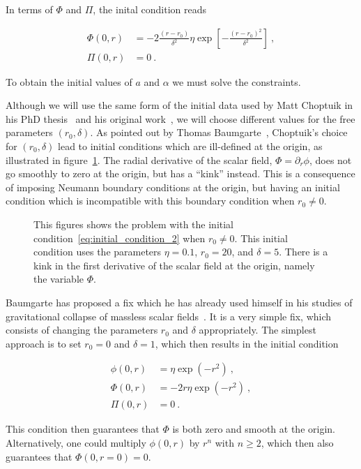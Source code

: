 \documentclass[a4paper,11pt]{article}
\renewcommand{\a}{\alpha}
\renewcommand{\d}{\delta}
\newcommand{\pd}{\partial}
\newcommand{\lrpar}[1]{\left( #1 \right)}
\newcommand{\lrsquare}[1]{\left[ #1 \right]}
\newcommand{\n}{\noindent}
\newcommand{\eq}[1]{
  \begin{equation}
    #1
  \end{equation}
}
\newcommand{\spl}[1]{
  \begin{split}
    #1
  \end{split}
}
\begin{document}
In terms of $\Phi$ and $\Pi$, the inital condition reads

\eq{
  \spl{
    \Phi(0,r) &= -2\frac{\lrpar{r-r_{0}}}{\d^{2}}\eta\exp\lrsquare{-\frac{\lrpar{r-r_{0}}^{2}}{\d^{2}}}\ ,\\
    \Pi(0,r)  &= 0\ .
  }
  \label{eq:initial_condition_2}
}

\n To obtain the initial values of $a$ and $\a$ we must solve the constraints.

Although we will use the same form of the initial data used by Matt Choptuik in his PhD thesis~\cite{Choptuik_1986} and his original work~\cite{PhysRevLett.70.9}, we will choose different values for the free parameters $\lrpar{r_{0},\d}$. As pointed out by Thomas Baumgarte~\cite{Baumgarte_private}, Choptuik's choice for $\lrpar{r_{0},\d}$ lead to initial conditions which are ill-defined at the origin, as illustrated in figure~\ref{fig:origin_problem}. The radial derivative of the scalar field, $\Phi=\pd_{r}\phi$, does not go smoothly to zero at the origin, but has a ``kink'' instead. This is a consequence of imposing Neumann boundary conditions at the origin, but having an initial condition which is incompatible with this boundary condition when $r_{0}\neq 0$.

\begin{figure}[H]
  \centering
  
  \caption[Problem with the initial condition at the origin.]{This figures shows the problem with the initial condition~\eqref{eq:initial_condition_2} when $r_{0}\neq0$. This initial condition uses the parameters $\eta=0.1$, $r_{0}=20$, and $\d=5$. There is a kink in the first derivative of the scalar field at the origin, namely the variable $\Phi$.}
  \label{fig:origin_problem}
\end{figure}

Baumgarte has proposed a fix which he has already used himself in his studies of gravitational collapse of massless scalar fields~\cite{Baumgarte_2018}. It is a very simple fix, which consists of changing the parameters $r_{0}$ and $\delta$ appropriately. The simplest approach is to set $r_{0}=0$ and $\d=1$, which then results in the initial condition

\eq{
  \spl{
    \phi(0,r) &= \eta\exp\lrpar{-r^{2}}\ ,\\
    \Phi(0,r) &= -2r\eta\exp\lrpar{-r^{2}}\ ,\\
    \Pi(0,r) &= 0\ .
  }
  \label{eq:initial_condition_new}
}

\n This condition then guarantees that $\Phi$ is both zero and smooth at the origin. Alternatively, one could multiply $\phi(0,r)$ by $r^{n}$ with $n\geq2$, which then also guarantees that $\Phi(0,r=0)=0$.
\end{document}
